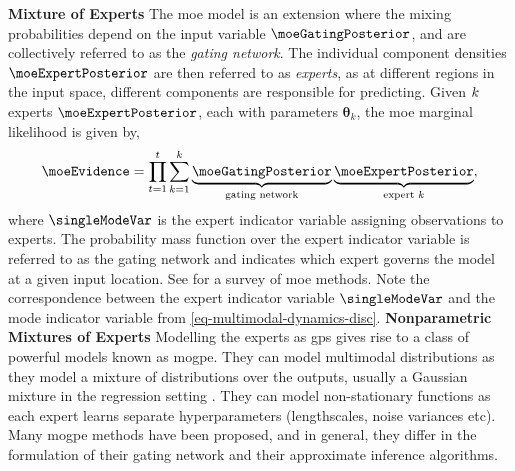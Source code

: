 \documentclass{mimosis-class/mimosis}
\numberwithin{equation}{chapter}
\newcommand{\numData}{\ensuremath{t}}
\newcommand{\modeInd}{\ensuremath{k}}
\newcommand{\NumData}{\ensuremath{\MakeUppercase{\numData}}}
\newcommand{\ModeInd}{\ensuremath{\MakeUppercase{\modeInd}}}
\newcommand{\mode}[1]{\ensuremath{#1_{\modeInd}}}
\newcommand{\latentFunc}{\ensuremath{f}}
\newcommand{\expertParamsK}{\ensuremath{\mode{\bm\theta}}}
\begin{document}
{\textbf{Mixture of Experts} The \acrfull{moe} model \citep{jacobsAdaptive1991} is
an extension where the mixing probabilities
depend on the input variable \(\moeGatingPosterior\), and are
collectively referred to as the \emph{gating network}.
The individual component densities \(\moeExpertPosterior\) are then referred to as \emph{experts},
as at different regions in the input space, different components are responsible for predicting.
Given \(\ModeInd\) experts \(\moeExpertPosterior\), each with parameters \(\expertParamsK\),
the \acrshort{moe} marginal likelihood is given by,
\begin{align} \label{eq-mixture-marginal-likelihood}
\moeEvidence = \prod_{\numData=1}^\NumData \sum_{\modeInd=1}^{\ModeInd}
\underbrace{\moeGatingPosterior}_{\text{gating network}}
\underbrace{\moeExpertPosterior}_{\text{expert } k},
\end{align}
where \(\singleModeVar\) is the expert indicator variable assigning observations to experts.
The probability mass function over the expert indicator variable is referred to as the gating network and
indicates which expert governs the model at a given input location.
See \cite{yukselTwenty2012} for a survey of \acrshort{moe} methods.
Note the correspondence between the expert indicator variable \(\singleModeVar\)
and the mode indicator variable from \cref{eq-multimodal-dynamics-disc}.
\newline
\textbf{Nonparametric Mixtures of Experts}
Modelling the experts as \acrshort{gps} gives rise to a class of powerful models known as \acrfull{mogpe}.
They can model multimodal distributions as they model a mixture of distributions
over the outputs, usually a Gaussian mixture in the regression setting \citep{trespMixtures2000a,rasmussenInfinite2001}.
They can model non-stationary functions as
each expert learns separate hyperparameters (lengthscales, noise variances etc).
Many \acrshort{mogpe} methods have been proposed, and in general, they differ in
the formulation of their gating network and their approximate inference algorithms.

\begin{figure}[t]
  \centering
    \begin{minipage}[r]{0.49\textwidth}
\end{minipage}
\end{figure}}
\end{document}
